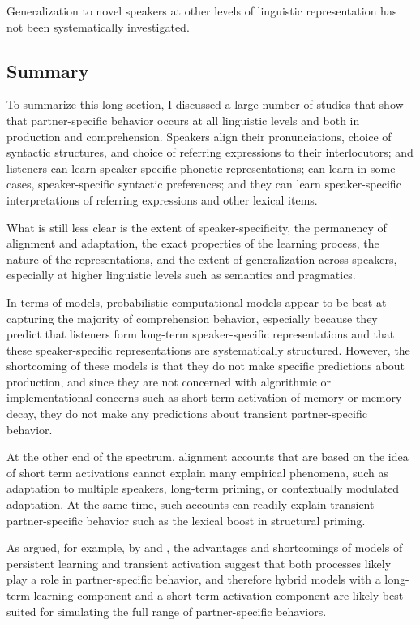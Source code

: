 Generalization to novel speakers at other levels of linguistic representation has not been systematically investigated. 

\subsection{Summary}

To summarize this long section, I discussed a large number of studies that show that partner-specific behavior occurs at all linguistic levels
and both in production and comprehension. Speakers align their pronunciations, choice of syntactic structures, and choice of referring expressions
to their interlocutors; and listeners can learn speaker-specific phonetic representations; can learn in some cases, speaker-specific syntactic preferences;
and they can learn speaker-specific interpretations of referring expressions and other lexical items.

What is still less clear is the extent of speaker-specificity, the permanency of alignment and adaptation, the exact properties of the learning process, the nature of the representations, and the extent
of generalization across speakers, especially at higher linguistic levels such as semantics and pragmatics.

In terms of models, probabilistic computational models appear to be best at capturing the majority of comprehension behavior, especially
because they predict that listeners form long-term speaker-specific representations and that these speaker-specific representations are
systematically structured. However, the shortcoming of these models is that they do not make specific predictions about production, and 
since they are not concerned with algorithmic or implementational concerns \cite{Marr1982} such as short-term activation of memory or 
memory decay, they do not make any predictions about transient partner-specific behavior.

At the other end of the spectrum, alignment accounts that are based on the idea of short term activations cannot explain many 
empirical phenomena, such as adaptation to multiple speakers, long-term priming, or contextually modulated adaptation. At the same time,
such accounts can readily explain transient partner-specific behavior such as the lexical boost in structural priming.

As argued, for example, by \cite{FerreiraBock2006} and \cite{ReitterEtAl2011}, the advantages and shortcomings of models of persistent learning
and transient activation suggest that both processes likely play a role in partner-specific behavior, and therefore hybrid models with a long-term learning
component and a short-term activation component are likely best suited for simulating the full range of partner-specific behaviors.

